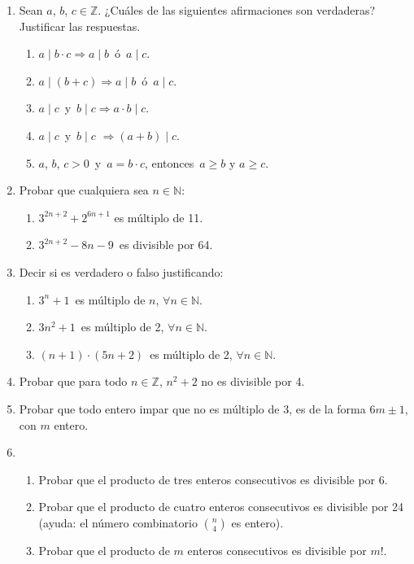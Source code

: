 \documentclass[a4paper,12pt,twoside,spanish,reqno]{amsbook}
\numberwithin{equation}{section}
\begin{document}
\begin{enumerate}
\item Sean $a$, $b$, $c \in {\mathbb Z}$. ¿Cuáles de las siguientes afirmaciones son verdaderas? Justificar las respuestas.
  \begin{enumerate}
  \item $a \mid b\cdot c \Rightarrow a \mid b$\, ó \,$a \mid c$.
  \item $a \mid (b+c) \Rightarrow a\mid b$\, ó \,$a \mid c$.
  \item $a \mid c$\, y \,$b \mid c \Rightarrow a\cdot b \mid c$.
  \item $a \mid c$\, y \,$b \mid c$ $\Rightarrow (a +b) \mid c$.
  \item $a$, $b$, $c>0$\, y \,$a=b\cdot c$, entonces\, $a \ge b$ y $a \ge c$.
  \end{enumerate}



\item Probar que cualquiera sea $n \in {\mathbb N}$:
  \begin{enumerate}
  \item $3^{2n+2}+ 2^{6n+1}$ es múltiplo de 11.
  \item $3^{2n+2} - 8n - 9$\, es divisible por 64.
  \end{enumerate}


\item Decir si es verdadero o falso justificando:
  \begin{enumerate}
  \item $3^n+1$\, es múltiplo de $n$, $\forall n \in {\mathbb N}$.
  \item $3n^2+1$\, es múltiplo de 2, $\forall n \in {\mathbb N}$.
  \item $(n+1)\cdot (5n+2)$\, es múltiplo de 2, $\forall n \in {\mathbb N}$.
  \end{enumerate}


\item Probar que para todo $n \in {\mathbb Z}$, $n^2 + 2$ no es divisible por 4.


\item Probar que todo entero impar que no es múltiplo de 3, es de la forma $6m\pm 1$, con $m$ entero.


\item 
\begin{enumerate}
 \item Probar que el producto de tres enteros consecutivos es divisible por 6.
 \item Probar que el producto de cuatro enteros consecutivos es divisible por 24 (ayuda: el número combinatorio $\binom{n}{4}$ es entero).
 \item Probar que el producto de $m$  enteros consecutivos es divisible por $m!$.
\end{enumerate}



\end{enumerate}
\end{document}
